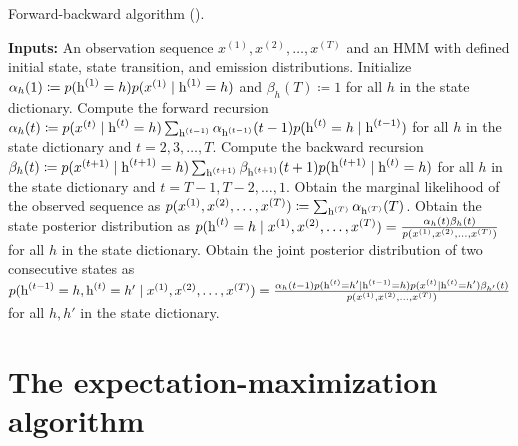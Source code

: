 \begin{algorithm}
    \caption{Forward-backward algorithm (\citet{Rabiner1986}).}
    \label{alg:forward_backward}
    \begin{algorithmic}[1]
        \State \textbf{Inputs:} An observation sequence $x^{(1)}, x^{(2)}, \dots, x^{(T)}$ and an HMM with defined initial state, state transition, and emission distributions.
        \vspace{0.3cm}
        \State Initialize $\alpha_h(1) \coloneqq p({\textnormal{h}}^{(1)}=h)p(x^{(1)} \mid {\textnormal{h}}^{(1)}=h)$ and $\beta_h(T) \coloneqq 1$ for all $h$ in the state dictionary.
        \vspace{0.3cm}
        \State Compute the forward recursion $\alpha_h(t) \coloneqq p(x^{(t)} \mid {\textnormal{h}}^{(t)}=h) \sum_{{\textnormal{h}}^{(t-1)}} \alpha_{{\textnormal{h}}^{(t-1)}}(t-1) p({\textnormal{h}}^{(t)}=h \mid {\textnormal{h}}^{(t-1)})$ for all $h$ in the state dictionary and $t=2, 3, \dots, T$.
        \vspace{0.3cm}
        \State Compute the backward recursion $\beta_h(t) \coloneqq p(x^{(t+1)} \mid {\textnormal{h}}^{(t+1)}=h) \sum_{{\textnormal{h}}^{(t+1)}} \beta_{{\textnormal{h}}^{(t+1)}}(t+1) p({\textnormal{h}}^{(t+1)} \mid {\textnormal{h}}^{(t)}=h) $ for all $h$ in the state dictionary and $t=T-1, T-2, \dots, 1$.
        \vspace{0.3cm}
        \State Obtain the marginal likelihood of the observed sequence as $p(x^{(1)}, x^{(2)}, \dots, x^{(T)}) \coloneqq \sum_{{\textnormal{h}}^{(T)}} \alpha_{{\textnormal{h}}^{(T)}}(T)$.
        \vspace{0.3cm}
        \State Obtain the state posterior distribution as $p({\textnormal{h}}^{(t)}=h \mid x^{(1)}, x^{(2)}, \dots, x^{(T)}) = \frac{\alpha_h(t)\beta_h(t)}{p(x^{(1)}, x^{(2)}, \dots, x^{(T)})}$ for all $h$ in the state dictionary.
        \vspace{0.3cm}
        \State Obtain the joint posterior distribution of two consecutive states as $p({\textnormal{h}}^{(t-1)}=h, {\textnormal{h}}^{(t)}=h' \mid x^{(1)}, x^{(2)}, \dots, x^{(T)}) = \frac{\alpha_h(t-1)p({\textnormal{h}}^{(t)}=h' \mid {\textnormal{h}}^{(t-1)}=h) p(x^{(t)} \mid {\textnormal{h}}^{(t)}=h')\beta_{h'}(t)}{p(x^{(1)}, x^{(2)}, \dots, x^{(T)})}$ for all $h,h'$ in the state dictionary.
    \end{algorithmic}
\end{algorithm}

\section{The expectation-maximization algorithm}
\label{sec:expectation_maximization}

